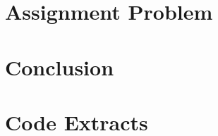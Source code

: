 \documentclass{newrucsthesis}
\begin{document}
	\chapter{Assignment Problem}
	
	
	\chapter{Conclusion}
	
	
	\appendix
	\chapter{Code Extracts}
	
	
	
	
\end{document}
